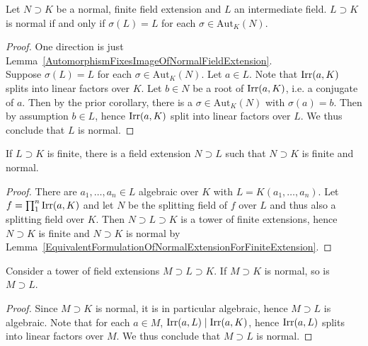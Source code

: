 \begin{corollary}\label{ExactConditionForNormalcyOfIntermediateField}
    Let $N\supset K$ be a normal, finite field extension and $L$ an intermediate field. $L\supset K$ is normal if and only if $\sigma(L) = L$ for each $\sigma\in \mathrm{Aut}_K(N)$. 
\end{corollary}
\begin{proof}
    One direction is just Lemma~\ref{AutomorphismFixesImageOfNormalFieldExtension}.\\
    Suppose $\sigma(L) = L$ for each $\sigma\in \mathrm{Aut}_K(N)$. Let $a\in L$. Note that $\mathrm{Irr}(a,K)$ splits into linear factors over $K$. Let $b\in N$ be a root of $\mathrm{Irr}(a,K)$, i.e. a conjugate of $a$. Then by the prior corollary, there is a $\sigma\in \mathrm{Aut}_K(N)$ with $\sigma(a)=b$. Then by assumption $b\in L$, hence $\mathrm{Irr}(a,K)$ split into linear factors over $L$. We thus conclude that $L$ is normal.   
\end{proof}

\begin{lemma}\label{IntermediateFieldProperOfNormality}
    If $L\supset K$ is finite, there is a field extension $N\supset L$ such that $N\supset K$ is finite and normal.
\end{lemma}
\begin{proof}
    There are $a_1,\dots,a_n\in L$ algebraic over $K$ with $L=K(a_1,\dots,a_n)$. Let $f = \prod_1^n \mathrm{Irr}(a,K)$ and let $N$ be the splitting field of $f$ over $L$ and thus also a splitting field over $K$. Then $N\supset L \supset K$ is a tower of finite extensions, hence $N\supset K$ is finite and $N\supset K$ is normal by Lemma~\ref{EquivalentFormulationOfNormalExtensionForFiniteExtension}.  
\end{proof}

\begin{lemma}\label{NormalExtensionOverLargerNormalFieldIsNormal}
    Consider a tower of field extensions $M\supset L\supset K$. If $M\supset K$ is normal, so is $M\supset L$.
\end{lemma}
\begin{proof}
    Since $M\supset K$ is normal, it is in particular algebraic, hence $M\supset L$ is algebraic. Note that for each $a\in M$, $\mathrm{Irr}(a,L)\mid \mathrm{Irr}(a,K)$, hence $\mathrm{Irr}(a,L)$ splits into linear factors over $M$. We thus conclude that $M\supset L$ is normal.  
\end{proof}


